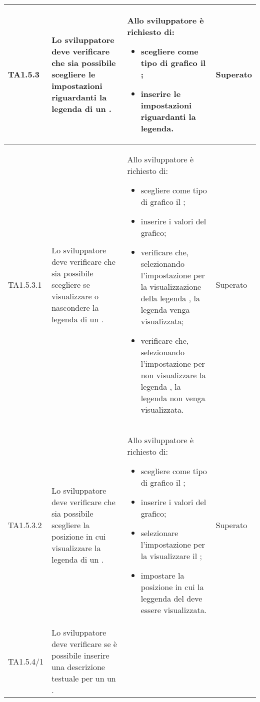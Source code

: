 \begin{longtabu}{| X[0.5] | X | X | X[0.5] |}
	TA1.5.3 & Lo sviluppatore deve verificare che sia possibile scegliere le impostazioni riguardanti la legenda di un .

		& Allo sviluppatore è richiesto di:
		\begin{itemize}
			\item scegliere come tipo di grafico il ;
			\item inserire le impostazioni riguardanti la legenda.
		\end{itemize}
& Superato \\ \hline

	TA1.5.3.1 & Lo sviluppatore deve verificare che sia possibile scegliere se visualizzare o nascondere la legenda di un .
			
		& Allo sviluppatore è richiesto di:
		\begin{itemize}
			\item scegliere come tipo di grafico il ;
			\item inserire i valori del grafico;
			\item verificare che, selezionando l'impostazione per la visualizzazione della legenda , la legenda venga visualizzata;
			\item verificare che, selezionando l'impostazione per non visualizzare la legenda , la legenda non venga visualizzata.
		\end{itemize}
& Superato \\ \hline

	TA1.5.3.2 & Lo sviluppatore deve verificare che sia possibile scegliere la posizione in cui visualizzare la legenda di un .
			
		& Allo sviluppatore è richiesto di:
		\begin{itemize}
			\item scegliere come tipo di grafico il ;
			\item inserire i valori del grafico;
			\item selezionare l'impostazione per la visualizzare il ;
			\item impostare la posizione in cui la leggenda del  deve essere visualizzata.
		\end{itemize}
& Superato \\ \hline

	TA1.5.4/1 & Lo sviluppatore deve verificare se è possibile inserire una descrizione testuale per un un .


\end{longtabu}

